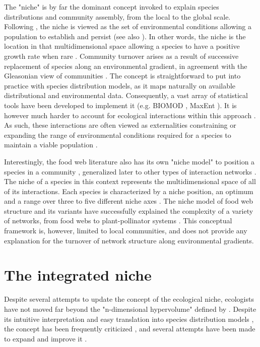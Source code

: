 \documentclass[12pt]{article}
\begin{document}
The "niche" is by far the dominant concept invoked to explain species
distributions and community assembly, from the local to the global scale.
Following \citet{Hutchinson1957}, the niche is viewed as the set of
environmental conditions allowing a population to establish and persist (see
also \citealt{Holt2009a}). In other words, the niche is the location in that
multidimensional space allowing a species to have a positive growth rate
when rare \citep{Godsoe2017}.  Community turnover arises as a result of
successive replacement of species along an environmental gradient, in
agreement with the Gleasonian view of communities \citep{Gleason1926}. The
concept is straightforward to put into practice with species distribution
models, as it maps naturally on available distributional and environmental
data. Consequently, a vast array of statistical tools have been developed to
implement it (e.g. BIOMOD \citealt{Thuiller2003}, MaxEnt
\citealt{Phillips2006}). It is however much harder to account for ecological
interactions within this approach \citep{Peterson2011}. As such, these
interactions are often viewed as externalities constraining or expanding the
range of environmental conditions required for a species to maintain a viable
population \citep{Pulliam2000, Soberon2007}.

Interestingly, the food web literature also has its own "niche model" to
position a species in a community \citep{Williams2000a}, generalized later to
other types of interaction networks \citep{Eklof2013}. The niche of a species
in this context represents the multidimensional space of all of its
interactions. Each species is characterized by a niche position, an optimum
and a range over three to five different niche axes \citep{Williams2000a,
Eklof2013}. The niche model of food web structure and its variants have
successfully explained the complexity of a variety of networks, from food webs
to plant-pollinator systems \citep{Allesina2008, Williams2010, Eklof2013}.
This conceptual framework is, however, limited to local communities, and does
not provide any explanation for the turnover of network structure along
environmental gradients.

\section*{The integrated niche}

Despite several attempts to update the concept of the ecological niche,
ecologists have not moved far beyond the "n-dimensional hypervolume" defined
by \citet{Hutchinson1957}. Despite its intuitive interpretation and easy
translation into species distribution models \citep{Boulangeat2012,
Blonder2014}, the concept has been frequently criticized \citep{Hardin1960,
Peters1991, Silvertown2004}, and several attempts have been made to expand and
improve it \citep{Pulliam2000, Chase2003, Soberon2007, Holt2009a,
McInerny2012b}.
\end{document}
